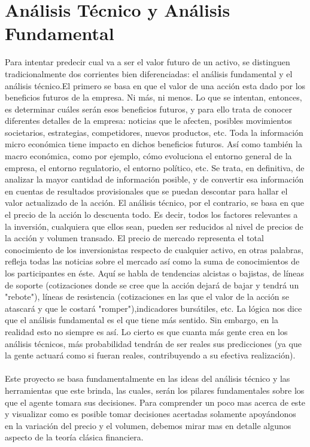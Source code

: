 \section{Análisis Técnico y Análisis Fundamental}
Para intentar predecir cual va a ser el valor futuro de un activo, se distinguen tradicionalmente dos corrientes bien diferenciadas: el análisis fundamental y el análisis técnico.El primero se basa en que el valor de una acción esta dado por los beneficios futuros de la empresa. Ni más, ni menos. Lo que se intentan, entonces, es determinar cuáles serán esos beneficios futuros, y para ello trata de conocer diferentes detalles de la empresa: noticias que le afecten, posibles movimientos societarios, estrategias, competidores, nuevos productos, etc. Toda la información micro económica tiene impacto en dichos beneficios futuros. Así como también la macro económica, como por ejemplo, cómo evoluciona el entorno general de la empresa, el entorno regulatorio, el entorno político, etc. Se trata, en definitiva, de analizar la mayor cantidad de información posible, y de convertir esa información en cuentas de resultados provisionales que se puedan descontar para hallar el valor actualizado de la acción. 
El análisis técnico, por el contrario, se basa en que el precio de la acción lo descuenta todo. Es decir, todos los factores relevantes a la inversión, cualquiera que ellos sean, pueden ser reducidos al nivel de precios de la acción y volumen transado. El precio de mercado representa el total conocimiento de los inversionistas respecto de cualquier activo, en otras palabras, refleja todas las noticias sobre el mercado así como la suma de conocimientos de los participantes en éste.  Aquí se habla de tendencias alcistas o bajistas, de líneas de soporte (cotizaciones donde se cree que la acción dejará de bajar y tendrá un "rebote"), líneas de resistencia (cotizaciones en las que el valor de la acción se atascará y que le costará "romper"),indicadores bursátiles,  etc. 
La lógica nos dice que el análisis fundamental es el que tiene más sentido. Sin embargo, en la realidad esto no siempre es así. Lo cierto es que cuanta más gente crea en los análisis técnicos, más probabilidad tendrán de ser reales sus predicciones (ya que la gente actuará como si fueran reales, contribuyendo a su efectiva realización).
\\\\
Este proyecto se basa fundamentalmente en las ideas del análisis técnico y las herramientas que este brinda, las cuales, serán los pilares fundamentales sobre los que el agente tomara sus decisiones.
Para comprender un poco mas acerca de este y visualizar como es posible tomar decisiones acertadas solamente apoyándonos en la variación del precio y el volumen, debemos mirar mas en detalle algunos aspecto de la teoría clásica financiera.

